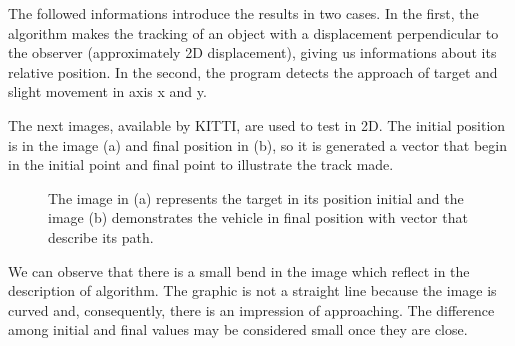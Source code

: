 The followed informations introduce the results in two cases. 
In the first, the algorithm makes the tracking of an object with 
a displacement perpendicular to the observer (approximately 2D displacement),
giving us informations about its relative position. 
In the second, the program detects the approach of target and 
slight movement in axis x and y.


The next images, available by KITTI, are used to test in 2D. 
The initial position is in the image (a) and final position in (b), 
so it is generated a vector that begin in the initial point and final 
point to illustrate the track made.

\begin{figure}[H]
\centering
  \caption{The image in (a) represents the target in its position 
  initial and the image (b) demonstrates the vehicle in final position with vector 
  that describe its path.}
\end{figure}


We can observe that there is a small bend in the image which 
reflect in the description of algorithm. 
The graphic is not a straight line because the image is curved and,
consequently, there is an impression of approaching. The difference among initial 
and final values may be considered small once they are close.


